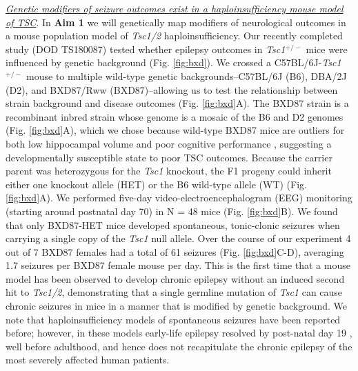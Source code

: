 \documentclass[
  12pt,
]{article}
\begin{document}
\textit{\underline{Genetic modifiers of seizure outcomes exist in a haploinsufficiency mouse model of TSC}}.
In \textbf{Aim 1} we will genetically map modifiers of neurological
outcomes in a mouse population model of \textit{Tsc1/2}
haploinsufficiency. Our recently completed study (DOD TS180087) tested
whether epilepsy outcomes in \textit{Tsc1}\(^{+/-}\) mice were
influenced by genetic background (Fig. \ref{fig:bxd}). We crossed a
C57BL/6J-\textit{Tsc1}\(^{+/-}\) mouse to multiple wild-type genetic
backgrounds--C57BL/6J (B6), DBA/2J (D2), and BXD87/Rww (BXD87)--allowing
us to test the relationship between strain background and disease
outcomes (Fig. \ref{fig:bxd}A). The BXD87 strain is a recombinant inbred
strain whose genome is a mosaic of the B6 and D2 genomes (Fig.
\ref{fig:bxd}A), which we chose because wild-type BXD87 mice are
outliers for both low hippocampal volume and poor cognitive performance
\cite{26449520, 28544613, 29457871}, suggesting a developmentally
susceptible state to poor TSC outcomes. Because the carrier parent was
heterozygous for the \textit{Tsc1} knockout, the F1 progeny could
inherit either one knockout allele (HET) or the B6 wild-type allele (WT)
(Fig. \ref{fig:bxd}A). We performed five-day video-electroencephalogram
(EEG) monitoring (starting around postnatal day 70) in N = 48 mice (Fig.
\ref{fig:bxd}B). We found that only BXD87-HET mice developed
spontaneous, tonic-clonic seizures when carrying a single copy of the
\textit{Tsc1} null allele. Over the course of our experiment 4 out of 7
BXD87 females had a total of 61 seizures (Fig. \ref{fig:bxd}C-D),
averaging 1.7 seizures per BXD87 female mouse per day. This is the first
time that a mouse model has been observed to develop chronic epilepsy
without an induced second hit to \textit{Tsc1/2}, demonstrating that a
single germline mutation of \textit{Tsc1} can cause chronic seizures in
mice in a manner that is modified by genetic background. We note that
haploinsufficiency models of spontaneous seizures have been reported
before; however, in these models early-life epilepsy resolved by
post-natal day 19 \cite{25081057}, well before adulthood, and hence does
not recapitulate the chronic epilepsy of the most severely affected
human patients.
\end{document}
